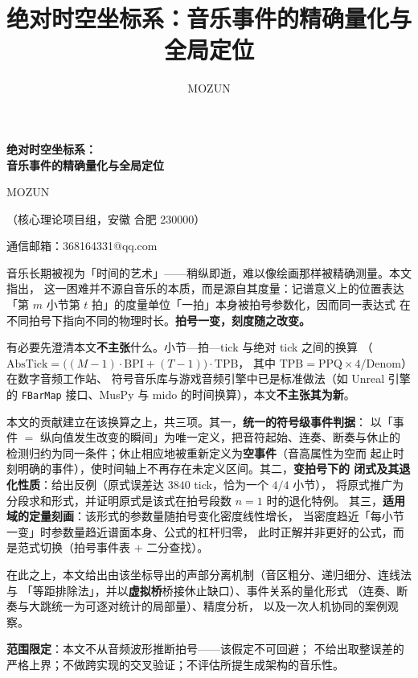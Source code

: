 \documentclass[11pt,a4paper,fontset=none]{ctexart}
\title{绝对时空坐标系：音乐事件的精确量化与全局定位}
\author{MOZUN}
\date{}
\begin{document}
\thispagestyle{empty}

\begin{center}
{\sffamily\bfseries\fontsize{17}{21}\selectfont
 绝对时空坐标系：\\[0.18em]
 音乐事件的精确量化与全局定位\par}

\vspace{0.9em}
{\normalsize MOZUN\par}
\vspace{0.35em}
{\small（核心理论项目组，安徽 合肥 230000）\par}
\vspace{0.25em}
{\small 通信邮箱：368164331@qq.com\par}
\end{center}

\vspace{0.4em}
\begin{摘要}

音乐长期被视为「时间的艺术」——稍纵即逝，难以像绘画那样被精确测量。本文指出，
这一困难并不源自音乐的本质，而是源自其度量：记谱意义上的位置表达
「第 $m$ 小节第 $t$ 拍」的度量单位「一拍」本身被拍号参数化，因而同一表达式
在不同拍号下指向不同的物理时长。\textbf{拍号一变，刻度随之改变。}

有必要先澄清本文\textbf{不主张}什么。小节—拍—tick 与绝对 tick 之间的换算
（$\mathrm{AbsTick}=\bigl((M-1)\cdot\mathrm{BPI}+(T-1)\bigr)\cdot\mathrm{TPB}$，
其中 $\mathrm{TPB}=\mathrm{PPQ}\times4/\mathrm{Denom}$）在数字音频工作站、
符号音乐库与游戏音频引擎中已是标准做法（如 Unreal 引擎的 \texttt{FBarMap}
接口、MusPy 与 mido 的时间换算），本文\textbf{不主张其为新}。

本文的贡献建立在该换算之上，共三项。其一，\textbf{统一的符号级事件判据}：
以「事件 $=$ 纵向值发生改变的瞬间」为唯一定义，把音符起始、连奏、断奏与休止的
检测归约为同一条件；休止相应地被重新定义为\textbf{空事件}（音高属性为空而
起止时刻明确的事件），使时间轴上不再存在未定义区间。其二，\textbf{变拍号下的
闭式及其退化性质}：给出反例（原式误差达 $3840$ tick，恰为一个 $4/4$ 小节），
将原式推广为分段求和形式，并证明原式是该式在拍号段数 $n=1$ 时的退化特例。
其三，\textbf{适用域的定量刻画}：该形式的参数量随拍号变化密度线性增长，
当密度趋近「每小节一变」时参数量趋近谱面本身、公式的杠杆归零，
此时正解并非更好的公式，而是范式切换（拍号事件表 $+$ 二分查找）。

在此之上，本文给出由该坐标导出的声部分离机制（音区粗分、递归细分、连线法与
「等距排除法」，并以\textbf{虚拟桥}桥接休止缺口）、事件关系的量化形式
（连奏、断奏与大跳统一为可逐对统计的局部量）、精度分析，
以及一次人机协同的案例观察。

\textbf{范围限定}：本文不从音频波形推断拍号——该假定不可回避；
不给出取整误差的严格上界；不做跨实现的交叉验证；不评估所提生成架构的音乐性。
\end{摘要}
\end{document}
